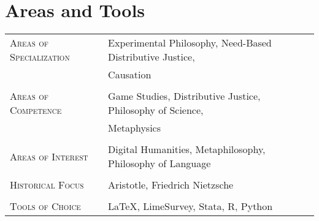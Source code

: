 \documentclass[a4paper,10pt]{article}
\begin{document}
\section{Areas and Tools}
\begin{longtable}{p{4cm}p{11.5cm}}
   \textsc{Areas of Specialization}   & Experimental Philosophy, Need-Based Distributive Justice,\\
                                      & Causation\\
                                      & \\
   \textsc{Areas of Competence}       & Game Studies, Distributive Justice, Philosophy of Science,\\
                                      & Metaphysics\\
                                      & \\
   \textsc{Areas of Interest}         & Digital Humanities, Metaphilosophy, Philosophy of Language\\
                                      & \\
   \textsc{Historical Focus}          & Aristotle, Friedrich Nietzsche\\
                                      & \\
   \textsc{Tools of Choice}           & \LaTeX, LimeSurvey, Stata, R, Python
\end{longtable}


\clearpage
\end{document}
